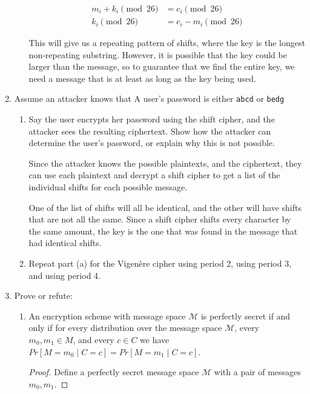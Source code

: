 \documentclass{article}
\begin{document}
\begin{enumerate}
\begin{enumerate}
        \begin{align*}
          m_i + k_i \pmod{26} &= c_i \pmod{26}\\
          k_i \pmod{26} &= c_i - m_i \pmod{26}
        \end{align*}

        This will give us a repeating pattern of shifts, where the key is the
        longest non-repeating substring. However, it is possible that the key
        could be larger than the message, so to guarantee that we find the
        entire key, we need a message that is at least as long as the key being
        used.
    \end{enumerate}

  \item Assume an attacker knows that A user's password is either
    \verb|abcd| or \verb|bedg|
    \begin{enumerate}
      \item Say the user encrypts her password using the shift cipher, and the 
        attacker sees the resulting ciphertext. Show how the attacker can 
        determine the user’s password, or explain why this is not possible.

        Since the attacker knows the possible plaintexts, and the ciphertext,
        they can use each plaintext and decrypt a shift cipher to get a list of
        the individual shifts for each possible message.

        One of the list of shifts will all be identical, and the other will have
        shifts that are not all the same. Since a shift cipher shifts every
        character by the same amount, the key is the one that was found in the
        message that had identical shifts.

      \item Repeat part (a) for the Vigen\`ere cipher using period 2, using 
        period 3, and using period 4.
    \end{enumerate}
  \item Prove or refute:
    \begin{enumerate}
      \item An encryption scheme with message space $\mathcal{M}$ is perfectly
        secret if and only if for every distribution over the message space 
        $\mathcal{M}$, every $m_0, m_1 \in M$, and every $c \in C$ we have 
        $Pr\left[M = m_0 \mid C = c\right] = Pr\left[M = m_1 \mid C = c\right]$.

        \begin{proof}
          Define a perfectly secret message space $\mathcal{M}$ with a pair of messages $m_0,
          m_1$.


\end{proof}
\end{enumerate}
\end{enumerate}
\end{document}
